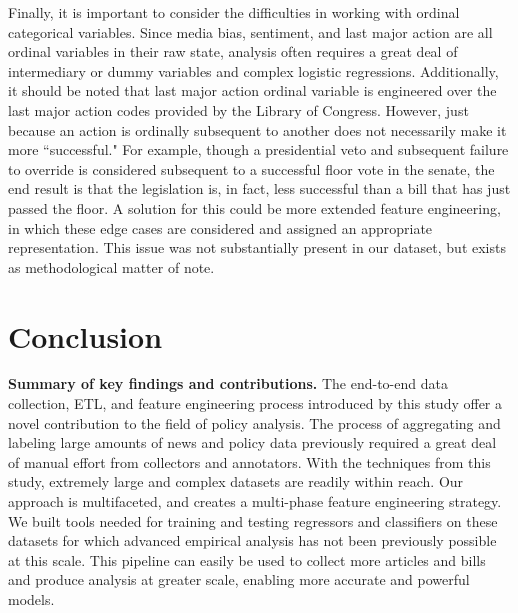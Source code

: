 \documentclass[letterpaper,11pt]{article}
\begin{document}
Finally, it is important to consider the difficulties in working with ordinal categorical variables. Since media bias, sentiment, and last major action are all ordinal variables in their raw state, analysis often requires a great deal of intermediary or dummy variables and complex logistic regressions. Additionally, it should be noted that last major action ordinal variable is engineered over the last major action codes provided by the Library of Congress. However, just because an action is ordinally subsequent to another does not necessarily make it more ``successful." For example, though a presidential veto and subsequent failure to override is considered subsequent to a successful floor vote in the senate, the end result is that the legislation is, in fact, less successful than a bill that has just passed the floor. A solution for this could be more extended feature engineering, in which these edge cases are considered and assigned an appropriate representation. This issue was not substantially present in our dataset, but exists as methodological matter of note.


\section{Conclusion}

\vspace{.1in}

\quad\textbf{Summary of key findings and contributions.}
The end-to-end data collection, ETL, and feature engineering process introduced by this study offer a novel contribution to the field of policy analysis. The process of aggregating and labeling large amounts of news and policy data previously required a great deal of manual effort from collectors and annotators. With the techniques from this study, extremely large and complex datasets are readily within reach. Our approach is multifaceted, and creates a multi-phase feature engineering strategy. We built tools needed for training and testing regressors and classifiers on these datasets for which advanced empirical analysis has not been previously possible at this scale. This pipeline can easily be used to collect more articles and bills and produce analysis at greater scale, enabling more accurate and powerful models.\\
\end{document}
